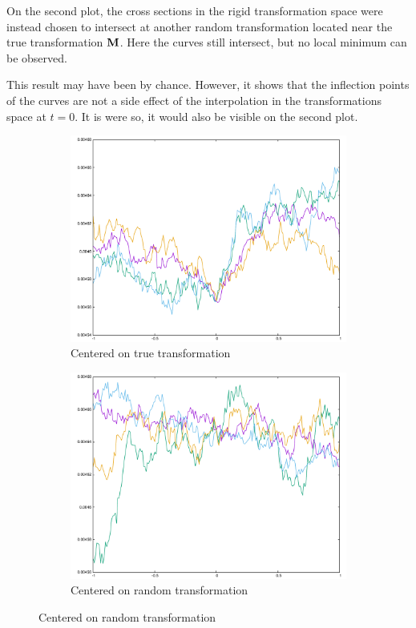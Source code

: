 {On the second plot, the cross sections in the rigid transformation space were instead chosen to intersect at another random transformation located near the true transformation $\mathbf{M}$. Here the curves still intersect, but no local minimum can be observed.

This result may have been by chance. However, it shows that the inflection points of the curves are not a side effect of the interpolation in the transformations space at $t = 0$. It is were so, it would also be visible on the second plot.

\begin{figure}[H]
\begin{subfigure}{.49\textwidth}
	\includegraphics[width=\linewidth]{fig/ajherr/t3rr/c1.pdf}
	\caption{Centered on true transformation}
\end{subfigure}%
\begin{subfigure}{.49\textwidth}
	\includegraphics[width=\linewidth]{fig/ajherr/t3rr/c2.pdf}
	\caption{Centered on random transformation}
\end{subfigure}
\end{figure}



}